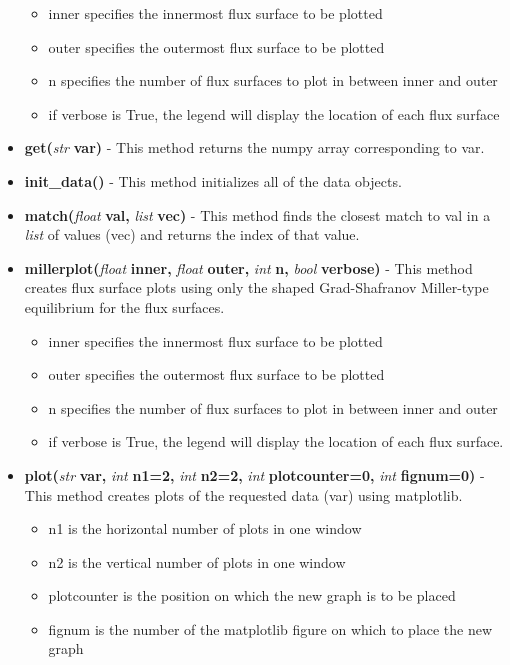 \documentclass{article}
\begin{document}
\begin{itemize}
\begin{itemize}
\item inner specifies the innermost flux surface to be plotted
\item outer specifies the outermost flux surface to be plotted
\item n specifies the number of flux surfaces to plot in between inner and outer
\item if verbose is True, the legend will display the location of each flux surface
\end{itemize}
\item \textbf{get(}\emph{str}\textbf{ var)} - This method returns the numpy array corresponding to var.
\item \textbf{init\_data()} - This method initializes all of the data objects.
\item \textbf{match(}\emph{float}\textbf{ val, }\emph{list}\textbf{ vec)} - This method finds the closest match to val in a \emph{list} of values (vec) and returns the index of that value.
\item \textbf{millerplot(}\emph{float}\textbf{ inner, }\emph{float}\textbf{ outer, }\emph{int}\textbf{ n, }\emph{bool}\textbf{ verbose)} - This method creates flux surface plots using only the shaped Grad-Shafranov Miller-type equilibrium for the flux surfaces.
\begin{itemize}
\item inner specifies the innermost flux surface to be plotted
\item outer specifies the outermost flux surface to be plotted
\item n specifies the number of flux surfaces to plot in between inner and outer
\item if verbose is True, the legend will display the location of each flux surface.
\end{itemize}
\item \textbf{plot(}\emph{str}\textbf{ var, }\emph{int}\textbf{ n1=2, }\emph{int}\textbf{ n2=2, }\emph{int}\textbf{ plotcounter=0, }\emph{int}\textbf{ fignum=0)} - This method creates plots of the requested data (var) using matplotlib.
\begin{itemize}
\item n1 is the horizontal number of plots in one window
\item n2 is the vertical number of plots in one window
\item plotcounter is the position on which the new graph is to be placed
\item fignum is the number of the matplotlib figure on which to place the new graph

\end{itemize}
\end{itemize}
\end{document}
